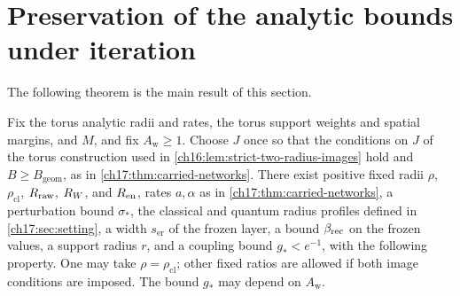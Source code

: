 \section{Preservation of the analytic bounds under iteration}\label{ch17:sec:iteration}

The following theorem is the main result of this section.

\begin{theorem}\label{ch17:thm:controlled-kernel}
Fix the torus analytic radii and rates, the torus support weights and spatial margins, and $M$, and fix $A_{\mathrm w}\ge1$. Choose $J$ once so that the conditions on $J$ of the torus construction used in \cref{ch16:lem:strict-two-radius-images} hold and $B\ge B_{\mathrm{geom}}$, as in \cref{ch17:thm:carried-networks}. There exist positive fixed radii $\rho$, $\rho_{\mathrm{cl}}$, $R_{\mathrm{raw}}$, $R_W$, and $R_{\mathrm{en}}$, rates $a,\alpha$ as in \cref{ch17:thm:carried-networks}, a perturbation bound $\sigma_*$, the classical and quantum radius profiles defined in \cref{ch17:sec:setting}, a width $s_{\mathrm{er}}$ of the frozen layer, a bound $\beta_{\mathrm{rec}}$ on the frozen values, a support radius $r$, and a coupling bound $g_*<e^{-1}$, with the following property. One may take $\rho=\rho_{\mathrm{cl}}$; other fixed ratios are allowed if both image conditions are imposed. The bound $g_*$ may depend on $A_{\mathrm w}$.


\end{theorem}
